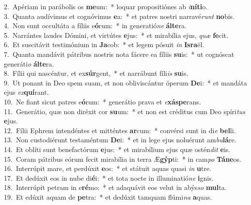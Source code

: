 {2.~}Apériam in parábolis os \textbf{me}um:~* loquar propositiónes ab \textit{i}\textbf{ní}\textbf{ti}o.\\
{3.~}Quanta audívimus et cognóvimus \textbf{e}a:~* et patres nostri narravé\textit{runt} \textbf{no}bis.\\
{4.~}Non sunt occultáta a fíliis e\textbf{ó}rum:~* in generatió\textit{ne} \textbf{ál}\textbf{te}ra.\\
{5.~}Narrántes laudes Dómini, et virtútes \textbf{e}jus:~* et mirabília ejus, \textit{quæ} \textbf{fe}cit.\\
{6.~}Et suscitávit testimónium in \textbf{Ja}cob:~* et legem pósuit \textit{in} \textbf{Is}\textbf{ra}ël.\\
{7.~}Quanta mandávit pátribus nostris nota fácere ea fíliis \textbf{su}is:~* ut cognóscat generáti\textit{o} \textbf{ál}\textbf{te}ra.\\
{8.~}Fílii qui nascéntur, et ex\textbf{súr}gent,~* et narrábunt fíli\textit{is} \textbf{su}is.\\
{9.~}Ut ponant in Deo spem suam, et non obliviscántur óperum \textbf{De}i:~* et mandáta ejus \textit{ex}\textbf{quí}rant.\\
{10.~}Ne fiant sicut patres e\textbf{ó}rum:~* generátio prava et \textit{e}\textbf{xá}\textbf{spe}rans.\\
{11.~}Generátio, quæ non diréxit cor \textbf{su}um:~* et non est créditus cum Deo spíri\textit{tus} \textbf{e}jus.\\
{12.~}Fílii Ephrem intendéntes et mitténtes \textbf{ar}cum:~* convérsi sunt in di\textit{e} \textbf{bel}li.\\
{13.~}Non custodiérunt testaméntum \textbf{De}i:~* et in lege ejus noluérunt am\textit{bu}\textbf{lá}re.\\
{14.~}Et oblíti sunt benefactórum \textbf{e}jus:~* et mirabílium ejus quæ ostén\textit{dit} \textbf{e}is.\\
{15.~}Coram pátribus eórum fecit mirabília in terra Æ\textbf{gýp}ti:~* in cam\textit{po} \textbf{Tá}\textbf{ne}os.\\
{16.~}Interrúpit mare, et perdúxit \textbf{e}os:~* et státuit aquas quasi \textit{in} \textbf{u}tre.\\
{17.~}Et dedúxit eos in nube di\textbf{é}i:~* et tota nocte in illuminatió\textit{ne} \textbf{i}gnis.\\
{18.~}Interrúpit petram in e\textbf{ré}mo:~* et adaquávit eos velut in abýs\textit{so} \textbf{mul}ta.\\
{19.~}Et edúxit aquam de \textbf{pe}tra:~* et dedúxit tamquam flúmi\textit{na} \textbf{a}quas.\\

